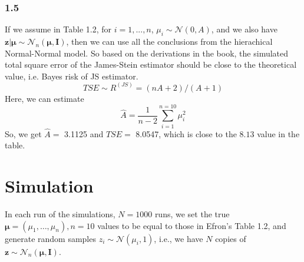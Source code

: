 \documentclass{article}\usepackage{graphicx, color}
\begin{document}
\subsubsection*{1.5}
If we assume in Table 1.2, for $i = 1, ..., n$,
$\mu_i \sim \mathcal{N}(0, A)$, and we also have
$\bm{z|\mu} \sim \mathcal{N}_n(\bm{\mu},\bm{I})$, then we can use all the
conclusions from the hierachical Normal-Normal model. \newline
So based on the derivations in the book, the simulated total square
error of the James-Stein estimator should be close to the theoretical 
value, i.e. Bayes risk of JS estimator.
\begin{displaymath}
TSE \sim R^{(JS)} = (nA + 2)/(A+1)
\end{displaymath}
Here, we can estimate
\begin{displaymath}
\hat{A} = \frac{1}{n-2} \sum_{i=1}^{n=10} \mu_i^2
\end{displaymath}
So, we get $\hat{A}=$ 3.1125 and $TSE=$ 8.0547, which is
close to the $8.13$ value in the table.


\newpage
\section*{Simulation}
\hspace{12 pt} In each run of the simulations, $N=1000$ runs,
we set the true $\bm{\mu}=(\mu_1,\dots,\mu_n), n=10$ 
values to be equal to those in Efron's Table 1.2, and generate random samples 
$z_i \sim \mathcal{N}(\mu_i,1)$, i.e., we have $N$ copies of
$\bm{z} \sim \mathcal{N}_n(\bm{\mu},\bm{I})$.
\end{document}
